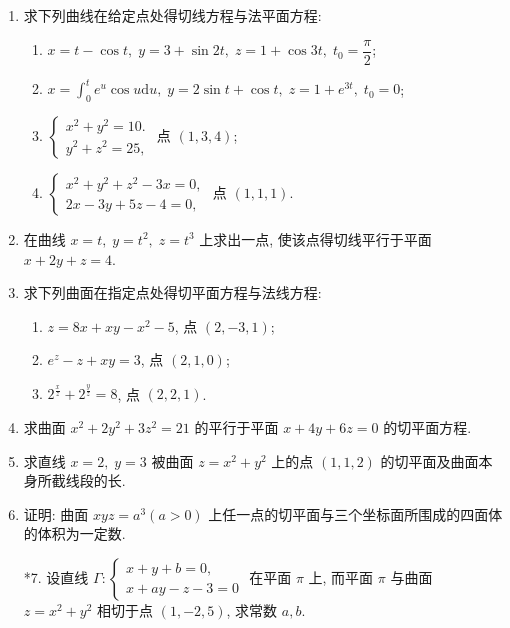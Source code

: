 \begin{enumerate}\setlength{\itemsep}{7pt}
    \item 求下列曲线在给定点处得切线方程与法平面方程:
    \begin{enumerate}[(1)]\setlength{\itemsep}{5pt}\setlength{\topsep}{15pt}
        \item $x=t-\cos t,\;y=3+\sin 2t,\;z=1+\cos3t,\;t_0=\dfrac{\pi}{2}$;
        \item $\displaystyle x=\int_0^{t}e^u\cos u\text{d}u,\;y=2\sin t+\cos t,\;z=1+e^{3t},\;t_0=0$;
        \item $\begin{cases}
            x^2+y^2=10.\\
            y^2+z^2=25,
        \end{cases}$
        点 $(1, 3, 4)$;
        \item $\begin{cases}
            x^2+y^2+z^2-3x=0,\\
            2x-3y+5z-4=0,
        \end{cases}$
        点 $(1, 1, 1)$.
    \end{enumerate}

    \item 在曲线 $x=t,\;y=t^2,\;z=t^3$ 上求出一点, 使该点得切线平行于平面 $x+2y+z=4$.
    
    \item 求下列曲面在指定点处得切平面方程与法线方程:
    \begin{enumerate}[(1)]\setlength{\itemsep}{5pt}\setlength{\topsep}{15pt}
        \item $z=8x+xy-x^2-5$, 点 $(2, -3, 1)$;
        \item $e^z-z+xy=3$, 点 $(2, 1, 0)$;
        \item $2^{\frac{x}{z}}+2^{\frac{y}{z}}=8$, 点 $(2, 2, 1)$.
    \end{enumerate}

    \item 求曲面 $x^2+2y^2+3z^2=21$ 的平行于平面 $x+4y+6z=0$ 的切平面方程.
    
    \item 求直线 $x=2,\;y=3$ 被曲面 $z=x^2+y^2$ 上的点 $(1, 1, 2)$ 的切平面及曲面本身所截线段的长.
    
    \item 证明: 曲面 $xyz=a^3 (a>0)$ 上任一点的切平面与三个坐标面所围成的四面体的体积为一定数.
    
    \item[*7.] 设直线 $\Gamma: \begin{cases}
        x+y+b=0,\\
        x+ay-z-3=0
    \end{cases}$ 在平面 $\pi$ 上, 而平面 $\pi$ 与曲面 $z=x^2+y^2$ 相切于点 $(1, -2, 5)$, 求常数 $a, b$.
\end{enumerate}

